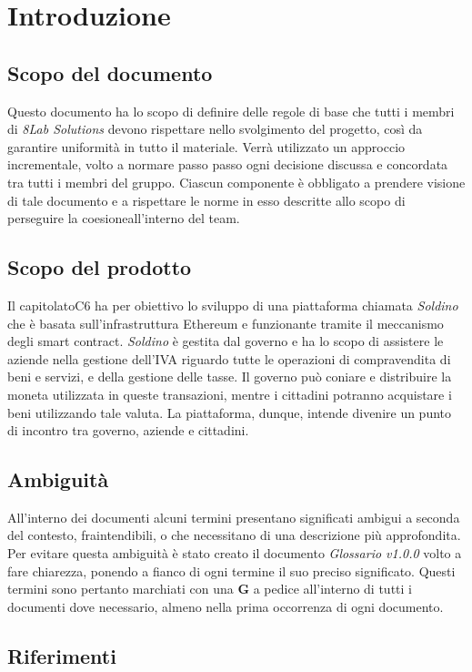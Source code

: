 \section{Introduzione}
\subsection{Scopo del documento}
Questo documento ha lo scopo di definire delle regole di base che tutti i membri 
di \textit{8Lab Solutions} devono rispettare nello svolgimento del progetto, 
così da garantire uniformità in tutto il materiale. Verrà utilizzato un 
approccio incrementale, volto a normare passo passo ogni decisione discussa e 
concordata tra tutti i membri del gruppo. Ciascun componente è obbligato a 
prendere visione di tale documento e a rispettare le norme in esso descritte 
allo scopo di perseguire la coesione\glosp all'interno del team.

\subsection{Scopo del prodotto}
Il capitolato\glosp C6 ha per obiettivo lo sviluppo di una piattaforma chiamata \textit{Soldino} che è basata sull'infrastruttura Ethereum\glo{} e funzionante tramite il meccanismo degli smart contract\glo{}. \textit{Soldino} è gestita dal governo e ha lo scopo di assistere le aziende nella gestione dell'IVA riguardo tutte le operazioni di compravendita di beni e servizi, e della gestione delle tasse. Il governo può coniare e 
distribuire la moneta utilizzata in queste transazioni, mentre i cittadini 
potranno acquistare i beni utilizzando tale valuta. La piattaforma, dunque, 
intende divenire un punto di incontro tra governo, aziende e cittadini.

\subsection{Ambiguità}
All'interno dei documenti alcuni termini presentano significati ambigui  a  
seconda del contesto, fraintendibili, o che necessitano di una descrizione più approfondita. Per evitare questa ambiguità è stato creato il documento 
\textit{Glossario v1.0.0} volto a fare chiarezza, ponendo a fianco di ogni 
termine il suo preciso significato. Questi termini sono pertanto marchiati con una \textbf{G} a pedice all'interno di tutti i documenti dove necessario, almeno nella prima occorrenza di ogni documento.

\subsection{Riferimenti}
